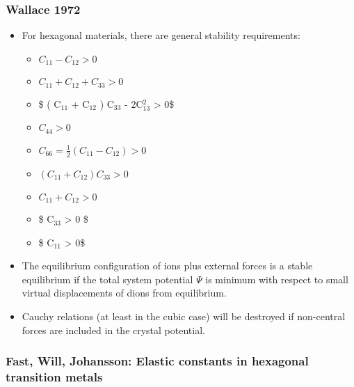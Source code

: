\documentclass[11pt]{article}
\begin{document}
\subsubsection{Wallace 1972}
\label{sec-2-4-1}
\begin{itemize}
\item For hexagonal materials, there are general stability requirements:
\begin{itemize}
\item $C_{11} - C_{12} > 0$
\item $C_{11} + C_{12} + C_{33} > 0$
\item \$ ( C$_{\text{11}}$ + C$_{\text{12}}$ ) C$_{\text{33}}$ - 2C$_{\text{13}}^{\text{2}}$ > 0\$
\item $C_{44} > 0$
\item $C_{66} = \frac{1}{2}(C_{11} - C_{12}) > 0$
\item $( C_{11} + C_{12} )C_{33} > 0$
\item $C_{11} + C_{12} > 0$
\item \$ C$_{\text{33}}$ > 0 \$
\item \$ C$_{\text{11}}$ > 0\$
\end{itemize}
\item The equilibrium configuration of ions plus external forces is a stable
equilibrium if the total system potential $\Psi$ is minimum with respect
to small virtual displacements of dions from equilibrium.
\item Cauchy relations (at least in the cubic case) will be destroyed if
non-central forces are included in the crystal potential.
\end{itemize}

\subsubsection{Fast, Will, Johansson: Elastic constants in hexagonal transition metals}
\label{sec-2-4-2}
\end{document}
